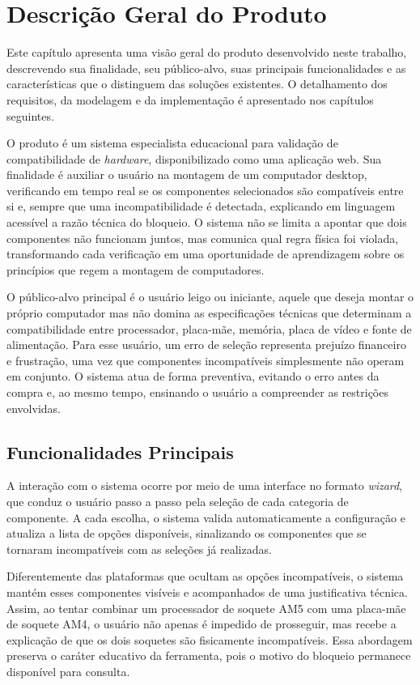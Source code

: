 \chapter{Descrição Geral do Produto}
\label{cap:04}

Este capítulo apresenta uma visão geral do produto desenvolvido neste trabalho, descrevendo sua finalidade, seu público-alvo, suas principais funcionalidades e as características que o distinguem das soluções existentes. O detalhamento dos requisitos, da modelagem e da implementação é apresentado nos capítulos seguintes.

O produto é um sistema especialista educacional para validação de compatibilidade de \textit{hardware}, disponibilizado como uma aplicação web. Sua finalidade é auxiliar o usuário na montagem de um computador desktop, verificando em tempo real se os componentes selecionados são compatíveis entre si e, sempre que uma incompatibilidade é detectada, explicando em linguagem acessível a razão técnica do bloqueio. O sistema não se limita a apontar que dois componentes não funcionam juntos, mas comunica qual regra física foi violada, transformando cada verificação em uma oportunidade de aprendizagem sobre os princípios que regem a montagem de computadores.

O público-alvo principal é o usuário leigo ou iniciante, aquele que deseja montar o próprio computador mas não domina as especificações técnicas que determinam a compatibilidade entre processador, placa-mãe, memória, placa de vídeo e fonte de alimentação. Para esse usuário, um erro de seleção representa prejuízo financeiro e frustração, uma vez que componentes incompatíveis simplesmente não operam em conjunto. O sistema atua de forma preventiva, evitando o erro antes da compra e, ao mesmo tempo, ensinando o usuário a compreender as restrições envolvidas.

\section{Funcionalidades Principais}
\label{sec:funcionalidades-principais}

A interação com o sistema ocorre por meio de uma interface no formato \textit{wizard}, que conduz o usuário passo a passo pela seleção de cada categoria de componente. A cada escolha, o sistema valida automaticamente a configuração e atualiza a lista de opções disponíveis, sinalizando os componentes que se tornaram incompatíveis com as seleções já realizadas.

Diferentemente das plataformas que ocultam as opções incompatíveis, o sistema mantém esses componentes visíveis e acompanhados de uma justificativa técnica. Assim, ao tentar combinar um processador de soquete AM5 com uma placa-mãe de soquete AM4, o usuário não apenas é impedido de prosseguir, mas recebe a explicação de que os dois soquetes são fisicamente incompatíveis. Essa abordagem preserva o caráter educativo da ferramenta, pois o motivo do bloqueio permanece disponível para consulta.

